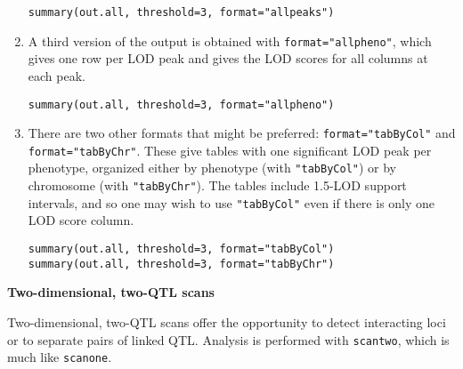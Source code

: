 \documentclass[10pt,letterpaper]{article}
\newcommand{\usercolor}{\color [named]{BlueViolet}}
\begin{document}
\begin{enumerate}
\usercolor
\verb|summary(out.all, threshold=3, format="allpeaks")|
\normalcolor

\item A third version of the output is obtained with
  \verb-format="allpheno"-, which gives one row per LOD peak and gives
  the LOD scores for all columns at each peak.

\usercolor
\verb|summary(out.all, threshold=3, format="allpheno")|
\normalcolor

\item There are two other formats that might be preferred:
  \verb-format="tabByCol"- and \verb-format="tabByChr"-.  These give
  tables with one significant LOD peak per phenotype, organized either
  by phenotype (with
  \verb-"tabByCol"-) or by chromosome (with \verb-"tabByChr"-).
  The tables include 1.5-LOD support intervals, and so one may wish to
  use \verb-"tabByCol"- even if there is only one LOD score column.

\usercolor
\verb|summary(out.all, threshold=3, format="tabByCol")| \\
\verb|summary(out.all, threshold=3, format="tabByChr")|
\normalcolor

\end{enumerate}


\clearpage

\textbf{Two-dimensional, two-QTL scans} \vspace{6pt}
\nopagebreak

Two-dimensional, two-QTL scans offer the opportunity to detect
interacting loci or to separate pairs of linked QTL.  Analysis is
performed with \verb-scantwo-, which is much like \verb-scanone-.
\end{document}
